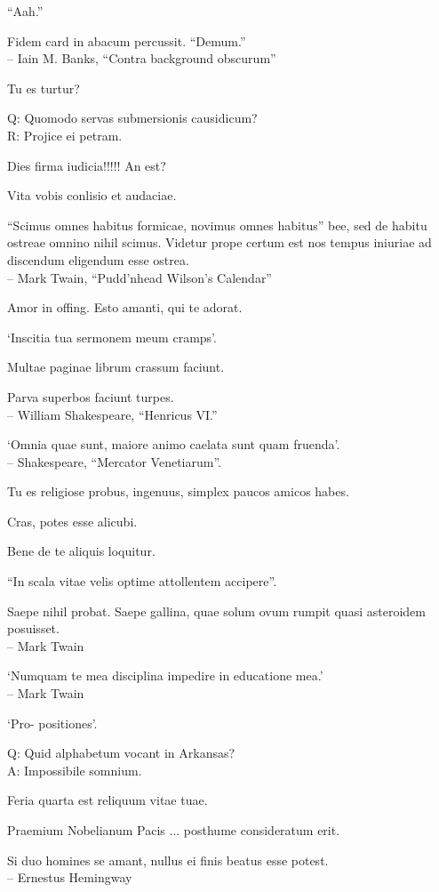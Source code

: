 \documentclass[titlepage,12pt]{memoir}
\begin{document}
“Aah.”

Fidem card in abacum percussit. “Demum.”
\\-- Iain M. Banks, “Contra background obscurum”

Tu es turtur?

Q: Quomodo servas submersionis causidicum?\\
R: Projice ei petram.

Dies firma iudicia!!!!! An est?

Vita vobis conlisio et audaciae.

“Scimus omnes habitus formicae, novimus omnes habitus”
bee, sed de habitu ostreae omnino nihil scimus. Videtur
prope certum est nos tempus iniuriae ad discendum eligendum esse
ostrea.
\\-- Mark Twain, “Pudd’nhead Wilson’s Calendar”

Amor in offing. Esto amanti, qui te adorat.

‘Inscitia tua sermonem meum cramps’.

Multae paginae librum crassum faciunt.

Parva superbos faciunt turpes.
\\-- William Shakespeare, “Henricus VI.”

‘Omnia quae sunt, maiore animo caelata sunt quam fruenda’.
\\-- Shakespeare, “Mercator Venetiarum”.

Tu es religiose probus, ingenuus, simplex
paucos amicos habes.

Cras, potes esse alicubi.

 Bene de te aliquis loquitur.

“In scala vitae velis optime attollentem accipere”.

Saepe nihil probat. Saepe gallina, quae solum ovum rumpit
quasi asteroidem posuisset.
\\-- Mark Twain

‘Numquam te mea disciplina impedire in educatione mea.’
\\-- Mark Twain

‘Pro- positiones’.

Q: Quid alphabetum vocant in Arkansas?\\
A: Impossibile somnium.

Feria quarta est reliquum vitae tuae.

Praemium Nobelianum Pacis ... posthume consideratum erit.

Si duo homines se amant, nullus ei finis beatus esse potest.
\\-- Ernestus Hemingway
\end{document}
